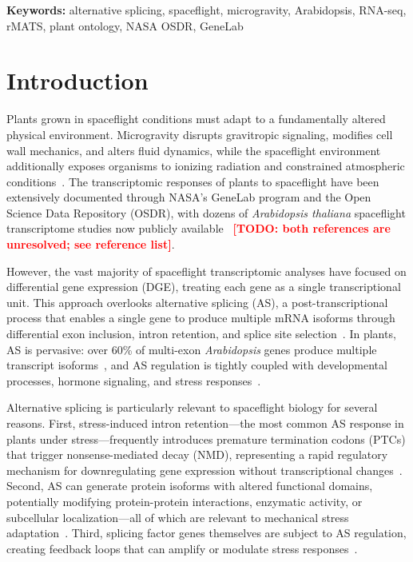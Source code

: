 \documentclass[12pt,a4paper]{article}
\newcommand{\TODO}[1]{\textcolor{red}{\textbf{[TODO: #1]}}}
\begin{document}
\begin{abstract}
events. These findings establish alternative splicing as a previously underappreciated layer of plant spaceflight adaptation and are packaged with FAIR metadata for reuse by the space biology community (\TODO{the analysis scripts are not yet in the repository}).
\end{abstract}

\textbf{Keywords:} alternative splicing, spaceflight, microgravity, Arabidopsis, RNA-seq, rMATS, plant ontology, NASA OSDR, GeneLab

\section{Introduction}

Plants grown in spaceflight conditions must adapt to a fundamentally altered physical environment. Microgravity disrupts gravitropic signaling, modifies cell wall mechanics, and alters fluid dynamics, while the spaceflight environment additionally exposes organisms to ionizing radiation and constrained atmospheric conditions~\cite{paul2012}. The transcriptomic responses of plants to spaceflight have been extensively documented through NASA's GeneLab program and the Open Science Data Repository (OSDR), with dozens of \textit{Arabidopsis thaliana} spaceflight transcriptome studies now publicly available~\cite{beheshti2018, ray2022} \TODO{both references are unresolved; see reference list}.

However, the vast majority of spaceflight transcriptomic analyses have focused on differential gene expression (DGE), treating each gene as a single transcriptional unit. This approach overlooks alternative splicing (AS), a post-transcriptional process that enables a single gene to produce multiple mRNA isoforms through differential exon inclusion, intron retention, and splice site selection~\cite{reddy2013}. In plants, AS is pervasive: over 60\% of multi-exon \textit{Arabidopsis} genes produce multiple transcript isoforms~\cite{marquez2012}, and AS regulation is tightly coupled with developmental processes, hormone signaling, and stress responses~\cite{staiger2013, filichkin2015}.

Alternative splicing is particularly relevant to spaceflight biology for several reasons. First, stress-induced intron retention---the most common AS response in plants under stress---frequently introduces premature termination codons (PTCs) that trigger nonsense-mediated decay (NMD), representing a rapid regulatory mechanism for downregulating gene expression without transcriptional changes~\cite{kalyna2012, drechsel2013}. Second, AS can generate protein isoforms with altered functional domains, potentially modifying protein-protein interactions, enzymatic activity, or subcellular localization---all of which are relevant to mechanical stress adaptation~\cite{syed2012}. Third, splicing factor genes themselves are subject to AS regulation, creating feedback loops that can amplify or modulate stress responses~\cite{reddy2011}.
\end{document}
